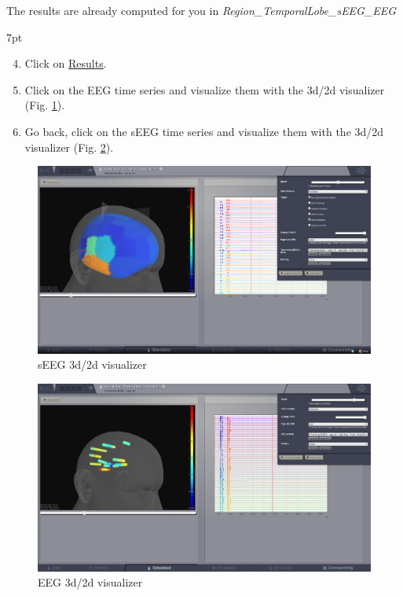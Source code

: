 \documentclass{tufte-handout}
\newenvironment{simulation}{%
  \def\FrameCommand{%
    \hspace{1pt}%
    {\color{ForestGreen}\vrule width 2pt}%
    {\color{simulationshade}\vrule width 4pt}%
    \colorbox{simulationshade}%
  }%
  \MakeFramed{\advance\hsize-\width\FrameRestore}%
  \noindent\hspace{-4.55pt}%
  \begin{adjustwidth}{}{7pt}%
  \vspace{2pt}\vspace{2pt}%
}
{%
  \vspace{2pt}\end{adjustwidth}\endMakeFramed%
}
\begin{document}
The results are already computed for you in \textit{Region\_TemporalLobe\_sEEG\_EEG}


\begin{simulation}
  \begin{enumerate}
    \setcounter{enumi}{3}
  \item Click on \underline{Results}.
  \item Click on the EEG time series and visualize them with the 3d/2d visualizer (Fig. \ref{fig:sEEG}).
  \item Go back, click on the sEEG time series and visualize them with the 3d/2d visualizer (Fig. \ref{fig:EEG}).
\end{enumerate}
\end{simulation}



\begin{figure}[h]
  \includegraphics[width=\linewidth]{Handout_UI_ModellingAnEpilepticPatient_EEG3d2dBrainVisualizer}%
  \caption{sEEG 3d/2d visualizer}%
  \label{fig:sEEG}%
\end{figure}

\begin{figure}[h]
  \includegraphics[width=\linewidth]{Handout_UI_ModellingAnEpilepticPatient_sEEG3d2dBrainVisualizer}%
  \caption{EEG 3d/2d visualizer}%
  \label{fig:EEG}%
\end{figure} 
\end{document}
